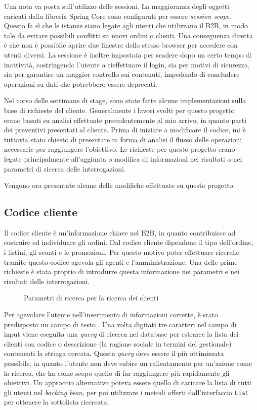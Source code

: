 Una nota va posta sull'utilizzo delle sessioni. La maggioranza degli oggetti caricati dalla libreria Spring Core sono configurati per essere \textit{session scope}. Questo fa sì che le istanze siano legate agli utenti che utilizzano il B2B, in modo tale da evitare possibili conflitti su nuovi ordini o clienti. Una conseguenza diretta è che non è possibile aprire due finestre dello stesso browser per accedere con utenti diversi. La sessione è inoltre impostata per scadere dopo un certo tempo di inattività, costringendo l'utente a rieffettuare il login, sia per motivi di sicurezza, sia per garantire un maggior controllo sui contenuti, impedendo di concludere operazioni su dati che potrebbero essere deprecati.

Nel corso delle settimane di stage, sono state fatte alcune implementazioni sulla base di richieste del cliente. Generalmente i lavori svolti per questo progetto erano basati su analisi effettuate precedentemente al mio arrivo, in quanto parti dei preventivi presentati al cliente. Prima di iniziare a modificare il codice, mi è tuttavia stato chiesto di presentare in forma di analisi il flusso delle operazioni necessarie per raggiungere l'obiettivo. Le richieste per questo progetto erano legate principalmente all'aggiunta o modifica di informazioni nei risultati o nei parametri di ricerca delle interrogazioni.

Vengono ora presentate alcune delle modifiche effettuate su questo progetto.

\subsection{Codice cliente}
Il codice cliente è un'informazione chiave nel B2B, in quanto contribuisce ad costruire ed individuare gli ordini. Dal codice cliente dipendono il tipo dell'ordine, i listini, gli sconti e le promozioni. Per questo motivo poter effettuare ricerche tramite questo codice agevola gli agenti e l'amministrazione. Una delle prime richieste è stata proprio di introdurre questa informazione nei parametri e nei risultati delle interrogazioni.
\begin{figure}
	\centering
	\caption{Parametri di ricerca per la ricerca dei clienti}
	\label{fig:clienti-params}
\end{figure}

Per agevolare l'utente nell'inserimento di informazioni corrette, è stato predisposto un campo di testo . Una volta digitati tre caratteri nel campo di input viene eseguita una \textit{query} di ricerca nel database per estrarre la lista dei clienti con codice o descrizione (la ragione sociale in termini del gestionale) contenenti la stringa cercata. Questa \textit{query} deve essere il più ottimizzata possibile, in quanto l'utente non deve subire un rallentamento per un'azione come la ricerca, che ha come scopo quello di far raggiungere più rapidamente gli obiettivi. Un approccio alternativo poteva essere quello di caricare la lista di tutti gli utenti nel \textit{backing bean}, per poi utilizzare i metodi offerti dall'interfaccia \texttt{List} per ottenere la sottolista ricercata.

